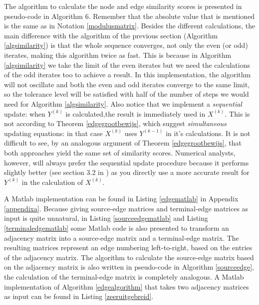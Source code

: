 \documentclass[a4paper,11pt]{report}
\begin{document}
 The algorithm to calculate the node and edge similarity scores is presented in pseudo-code in Algorithm 6. 
 Remember that the absolute value that is mentioned is the same as in Notation 
 \ref{modulusmatrix}. Besides the different calculations, the main difference with the algorithm of the previous section (Algorithm \ref{algsimilarity})
 is that the whole sequence converges, not only the even (or odd) iterates, 
 making this algorithm twice as fast. This is because in Algorithm \ref{algsimilarity} we take the limit
 of the even iterates but we need the calculations of the odd iterates too to achieve a result. In this
 implementation, the algorithm will not oscillate and both the even and odd iterates converge to the same limit, so the tolerance level will
 be satisfied with half of the number of steps we would need for Algorithm \ref{algsimilarity}. Also notice that we implement a \textit{sequential} 
 update: when $Y^{(k)}$ is calculated,the result is immediately used in 
 $X^{(k)}$. This is not according to Theorem \ref{edgegrootbewijs}, which 
 suggest \textit{simultaneous} updating equations: in that case $X^{(k)}$ uses $Y^{(k-1)}$ 
 in it's calculations. It is not difficult to see, by an analogous argument of 
 Theorem \ref{edgegrootbewijs}, that both approaches yield the same set of 
 similarity scores. Numerical analysts, however, will always prefer the sequential
 update procedure because it performs slightly better (see section 3.2 in \cite{numeriekwiskunde}) as you directly use a more accurate 
 result for $Y^{(k)}$ in the calculation of $X^{(k)}$. 
 
 A Matlab implementation 
 can be found in Listing \ref{edgematlab} in Appendix \ref{appendixa}. Because giving source-edge matrices and terminal-edge matrices as input
 is quite unnatural, in Listing \ref{sourceedgematlab} and Listing \ref{terminaledgematlab} 
 some Matlab code is also presented to transform an adjacency matrix into a 
 source-edge matrix and a terminal-edge matrix. The resulting matrices represent an edge numbering left-to-right, based on the entries of the adjacency matrix. The algorithm to calculate the 
 source-edge matrix based on the adjacency matrix is also written in pseudo-code in Algorithm 
 \ref{sourceedge}, the calculation of the terminal-edge matrix is completely 
 analogous. A Matlab implementation of Algorithm \ref{edgealgorithm} that takes 
 two adjacency matrices as input can be found in Listing \ref{zeeruitgebreid}.
 
\end{document}
